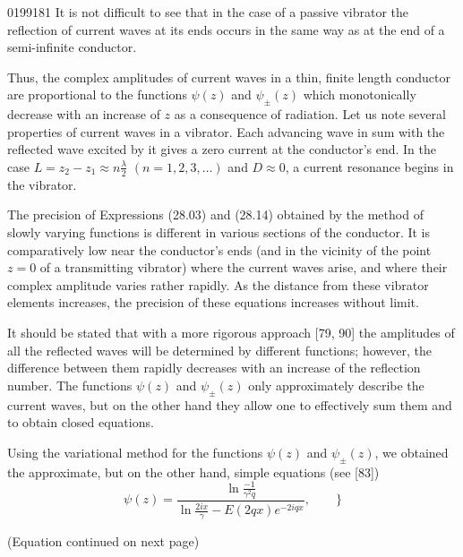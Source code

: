 \begin{scanpage}{0199}{181}
It is not difficult to see that in the case of a passive vibrator the reflection of current waves at its ends occurs in the same way as at the end of a semi-infinite conductor.

Thus, the complex amplitudes of current waves in a thin, finite length conductor are proportional to the functions $\psi(z)$ and $\psi_\pm(z)$ which monotonically decrease with an increase of $z$ as a consequence of radiation. Let us note several properties of current waves in a vibrator. Each advancing wave in sum with the reflected wave excited by it gives a zero current at the conductor's end. In the case $L=z_2-z_1\approx n\frac\lambda2$ $(n=1,2,3,\ldots)$ and $D\approx0$, a current resonance begins in the vibrator.

The precision of Expressions (28.03) and (28.14) obtained by the method of slowly varying functions is different in various sections of the conductor. It is comparatively low near the conductor's ends (and in the vicinity of the point $z=0$ of a transmitting vibrator) where the current waves arise, and where their complex amplitude varies rather rapidly. As the distance from these vibrator elements increases, the precision of these equations increases without limit.

It should be stated that with a more rigorous approach [79, 90] the amplitudes of all the reflected waves will be determined by different functions; however, the difference between them rapidly decreases with an increase of the reflection number. The functions $\psi(z)$ and $\psi_\pm(z)$ only approximately describe the current waves, but on the other hand they allow one to effectively sum them and to obtain closed equations.

Using the variational method for the functions $\psi(z)$ and $\psi_\pm(z)$, we obtained the approximate, but on the other hand, simple equations (see [83])
\[
\psi(z)=\frac{\displaystyle\ln\frac{-1}{\gamma^2q}}{\displaystyle\ln\frac{2ix}{\gamma}-E(2qx)e^{-2iqx}},\qquad\Biggr\}\tag{28.21}
\]
\begin{flushright}(Equation continued on next page)\end{flushright}
\end{scanpage}
